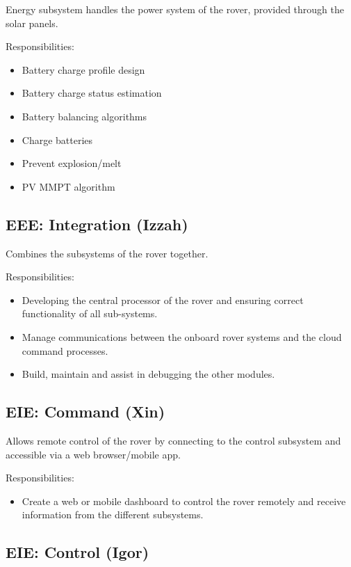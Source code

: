 \documentclass[10pt, a4paper]{article}
\begin{document}
Energy subsystem handles the power system of the rover, provided through the solar panels.

Responsibilities:
\begin{itemize}
    \item Battery charge profile design 
    \item Battery charge status estimation 
    \item Battery balancing algorithms 
    \item Charge batteries 
    \item Prevent explosion/melt
    \item PV MMPT algorithm
\end{itemize}

\subsection{EEE: Integration (Izzah)}

Combines the subsystems of the rover together.

Responsibilities:
\begin{itemize}
    \item Developing the central processor of the rover and ensuring correct functionality of all sub-systems.
    \item Manage communications between the onboard rover systems and the cloud command processes.
    \item Build, maintain and assist in debugging the other modules. 
\end{itemize}

\subsection{EIE: Command (Xin)}

Allows remote control of the rover by connecting to the control subsystem and accessible via a web browser/mobile app.

Responsibilities:
\begin{itemize}
    \item  Create a web or mobile dashboard to control the rover remotely and receive information from the different subsystems. 
\end{itemize}

\subsection{EIE: Control (Igor)}
\end{document}
